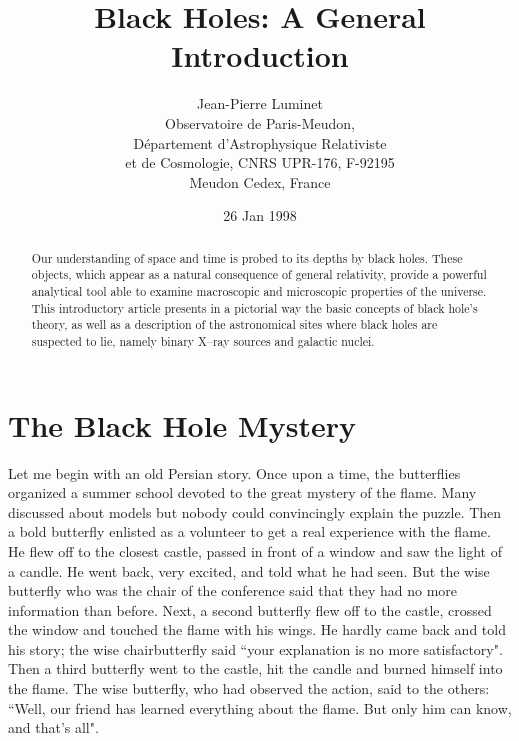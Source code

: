 \documentclass[12pt]{article}
\date{ 26 Jan 1998}
\begin{document}
\title{Black Holes: A General Introduction}
\author{\large Jean-Pierre Luminet \\Observatoire de Paris-Meudon,\\
D\'epartement d'Astrophysique Relativiste\\ et de  Cosmologie,
CNRS UPR-176, F-92195\\
 Meudon Cedex, France}
\maketitle
\label{chap:luminet}

\begin{abstract}
Our understanding of space and time is probed to its depths by black holes.
These objects, which appear as a natural consequence of general relativity,
provide a powerful analytical tool able to examine macroscopic and
microscopic properties of the universe. This introductory article presents
in a pictorial way the basic concepts of black hole's theory, as well as a
description of the astronomical sites where black holes are suspected to
lie, namely binary X--ray sources and galactic nuclei.
\end{abstract}

\section {The Black Hole Mystery}

Let me begin with an old Persian story. Once upon a time, the butterflies
organized a summer school devoted to the great
mystery of the flame. Many discussed about models but nobody could
convincingly explain the puzzle. Then a bold butterfly enlisted as a
volunteer to get a real experience with the flame. He flew off to the
closest castle, passed in front of a window and saw the light of a candle. He
went back, very excited, and told what he had seen. But the wise 
butterfly who was the chair of the conference said that they had no
more information than before.
Next, a second butterfly flew off to the castle, crossed the window and
touched the flame with his wings. He hardly came back and told his story; the wise
chairbutterfly said ``your explanation is no more satisfactory". Then a third
butterfly went to the castle, hit the candle and burned himself into the
flame. The wise butterfly, who had observed the action, said to the others:
``Well, our friend has learned everything about the flame. But only him can
know, and that's all".
\end{document}
